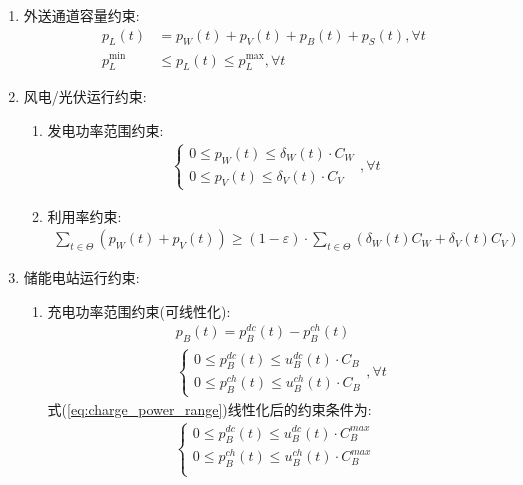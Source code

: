 \documentclass{article}
\begin{document}
\begin{enumerate}
    \item {外送通道容量约束:
        \begin{align}
            p_L(t)&=p_W(t)+p_V(t)+p_B(t)+p_S(t),\forall t\\p_L^{\min}&\le p_L(t)\le p_L^{\max},\forall t
        \end{align}
    }
    \item {风电/光伏运行约束:
        \begin{enumerate}
            \item {发电功率范围约束:
                \begin{align}
                    \begin{cases}0\leq p_W(t)\leq\delta_W(t)\cdot C_W\\0\leq p_V(t)\leq\delta_V(t)\cdot C_V\end{cases},\forall t
                \end{align}
            }
            \item {利用率约束:
                \begin{align}
                    \sum_{t\in\Theta}\left(p_W(t)+p_V(t)\right)\geq(1-\varepsilon)\cdot\sum_{t\in\Theta}\left(\delta_W(t)C_W+\delta_V(t)C_V\right)
                \end{align}
            }
        \end{enumerate}
    }
    \item {储能电站运行约束:
        \begin{enumerate}
            \item {充电功率范围约束({\color{red}可线性化}):
                \begin{align}
                    & p_{B}(t)=p_{B}^{dc}(t)-p_{B}^{ch}(t) \\
                    & \begin{cases}0\leq p_B^{dc}(t)\leq u_B^{dc}(t)\cdot C_B\\0\leq p_B^{ch}(t)\leq u_B^{ch}(t)\cdot C_B\end{cases},\forall t \label{eq:charge_power_range} 
                \end{align}
                式(\ref{eq:charge_power_range})线性化后的约束条件为:
                \begin{align}
                    \begin{cases}
                        0\leq p_B^{dc}(t)\leq u_B^{dc}(t)\cdot C_B^{max}\\
                        0\leq p_B^{ch}(t)\leq u_B^{ch}(t)\cdot C_B^{max}\\

\end{cases}
\end{align}}
\end{enumerate}}
\end{enumerate}
\end{document}

